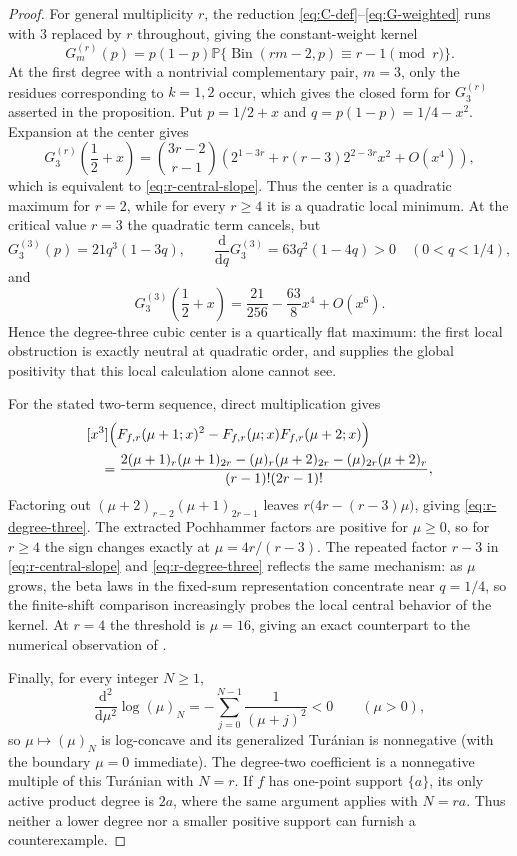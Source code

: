 \documentclass[11pt,a4paper]{amsart}
\numberwithin{equation}{section}
\theoremstyle{plain}
\theoremstyle{definition}
\newcommand{\Pp}{\mathbb P}
\begin{document}
\begin{proof}
For general multiplicity \(r\), the reduction
\eqref{eq:C-def}--\eqref{eq:G-weighted} runs with \(3\) replaced by \(r\)
throughout, giving the constant-weight kernel
\[
 G^{(r)}_m(p)=p(1-p)\Pp\{\operatorname{Bin}(rm-2,p)\equiv r-1\pmod r\}.
\]
At the first degree with a nontrivial complementary pair, \(m=3\), only the
residues corresponding to \(k=1,2\) occur, which gives the closed form for
\(G^{(r)}_3\) asserted in the proposition.  Put \(p=1/2+x\) and \(q=p(1-p)=1/4-x^2\).  Expansion at the
center gives
\[
 G^{(r)}_3\!\left(\frac12+x\right)
 =\binom{3r-2}{r-1}
  \left(2^{1-3r}+r(r-3)2^{2-3r}x^2+O(x^4)\right),
\]
which is equivalent to \eqref{eq:r-central-slope}.  Thus the center is a
quadratic maximum for \(r=2\), while for every \(r\ge4\) it is a quadratic
local minimum.  At the critical value \(r=3\) the quadratic term cancels, but
\[
 G^{(3)}_3(p)=21q^3(1-3q),
 \qquad
 \frac{\mathrm d}{\mathrm d q}G^{(3)}_3=63q^2(1-4q)>0
 \quad(0<q<1/4),
\]
and
\[
 G^{(3)}_3\!\left(\frac12+x\right)
 =\frac{21}{256}-\frac{63}{8}x^4+O(x^6).
\]
Hence the degree-three cubic center is a quartically flat maximum: the first
local obstruction is exactly neutral at quadratic order, and 
supplies the global positivity that this local calculation alone cannot see.

For the stated two-term sequence, direct multiplication gives
\begin{align*}
 &[x^3]\Bigl(
 F_{f,r}(\mu+1;x)^2-F_{f,r}(\mu;x)F_{f,r}(\mu+2;x)\Bigr)\\
 &\quad=
 \frac{2(\mu+1)_r(\mu+1)_{2r}
 -(\mu)_r(\mu+2)_{2r}
 -(\mu)_{2r}(\mu+2)_r}
 {(r-1)!(2r-1)!},
\end{align*}
Factoring out \((\mu+2)_{r-2}(\mu+1)_{2r-1}\) leaves
\(r\bigl(4r-(r-3)\mu\bigr)\), giving \eqref{eq:r-degree-three}.  The extracted
Pochhammer factors are positive for \(\mu\ge0\), so for \(r\ge4\) the sign
changes exactly at \(\mu=4r/(r-3)\).  The repeated factor \(r-3\) in
\eqref{eq:r-central-slope} and \eqref{eq:r-degree-three} reflects the same
mechanism: as \(\mu\) grows, the beta laws in the fixed-sum representation
concentrate near \(q=1/4\), so the finite-shift comparison increasingly probes
the local central behavior of the kernel.  At \(r=4\) the threshold is
\(\mu=16\), giving an exact counterpart to the numerical observation of
\cite[Rem.~5]{KarpZhang2024LogConcavity}.

Finally, for every integer \(N\ge1\),
\[
 \frac{\mathrm d^2}{\mathrm d\mu^2}\log(\mu)_N
 =-\sum_{j=0}^{N-1}\frac{1}{(\mu+j)^2}<0
 \qquad(\mu>0),
\]
so \(\mu\mapsto(\mu)_N\) is log-concave and its generalized Tur\'anian is
nonnegative (with the boundary \(\mu=0\) immediate).  The degree-two
coefficient is a nonnegative multiple of this Tur\'anian with \(N=r\).  If
\(f\) has one-point support \(\{a\}\), its only active product degree is
\(2a\), where the same argument applies with \(N=ra\).  Thus neither a lower
degree nor a smaller positive support can furnish a counterexample.
\end{proof}
\end{document}
